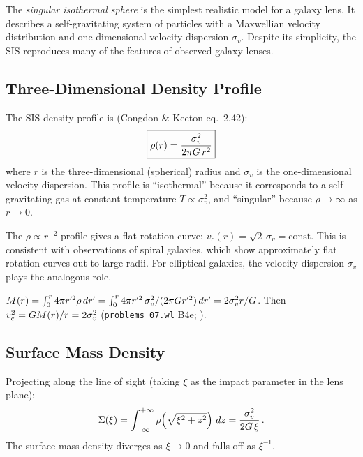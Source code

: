 The \emph{singular isothermal sphere} is the simplest realistic model
for a galaxy lens.  It describes a self-gravitating system of particles
with a Maxwellian velocity distribution and one-dimensional velocity
dispersion $\sigma_v$.  Despite its simplicity, the SIS reproduces many
of the features of observed galaxy lenses.

\subsection{Three-Dimensional Density Profile}

The SIS density profile is
(Congdon \& Keeton eq.~2.42):
\begin{equation}
    \boxed{
    \rho(r) = \frac{\sigma_v^2}{2\pi G\, r^2}
    }
    \label{eq:sis_rho}
\end{equation}
where $r$ is the three-dimensional (spherical) radius and $\sigma_v$ is
the one-dimensional velocity dispersion.  This profile is ``isothermal''
because it corresponds to a self-gravitating gas at constant temperature
$T \propto \sigma_v^2$, and ``singular'' because $\rho \to \infty$ as
$r \to 0$.

\begin{remark}
The $\rho \propto r^{-2}$ profile gives a flat rotation curve:
$v_c(r) = \sqrt{2}\,\sigma_v = \mathrm{const}$.  This is consistent
with observations of spiral galaxies, which show approximately flat
rotation curves out to large radii.  For elliptical galaxies, the
velocity dispersion $\sigma_v$ plays the analogous role.
\end{remark}

\begin{derivation}[$v_c = \sqrt2\,\sigma_v$]
$M(r) = \int_0^r4\pi r'^2\rho\,dr' = \int_0^r 4\pi r'^2\,\sigma_v^2/(2\pi G r'^2)\,dr'
= 2\sigma_v^2r/G$.  Then $v_c^2 = G M(r)/r = 2\sigma_v^2$
(\texttt{problems\_07.wl} B4e; \citealt[eq.~42]{narayan_lectures_1997}).
\end{derivation}

\subsection{Surface Mass Density}

Projecting along the line of sight (taking $\xi$ as the impact
parameter in the lens plane):
\begin{equation}
    \Sigma(\xi) = \int_{-\infty}^{+\infty}
    \rho\!\left(\sqrt{\xi^2 + z^2}\right)\, dz
    = \frac{\sigma_v^2}{2G\, \xi} \,.
    \label{eq:sis_sigma}
\end{equation}
The surface mass density diverges as $\xi \to 0$ and falls off as
$\xi^{-1}$.


